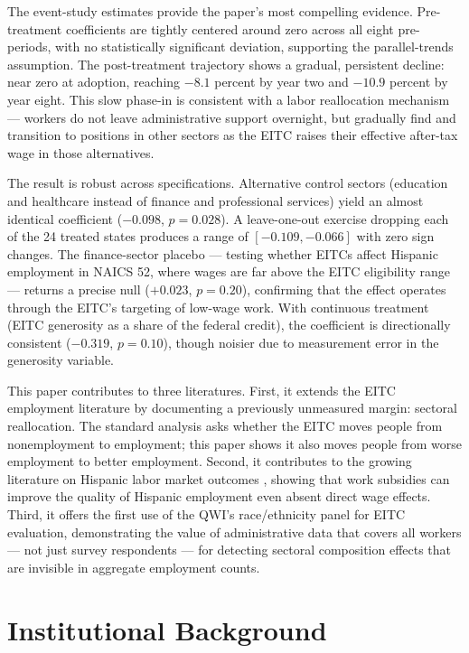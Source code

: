 \documentclass[12pt]{article}
\begin{document}
The event-study estimates provide the paper's most compelling evidence. Pre-treatment coefficients are tightly centered around zero across all eight pre-periods, with no statistically significant deviation, supporting the parallel-trends assumption. The post-treatment trajectory shows a gradual, persistent decline: near zero at adoption, reaching $-8.1$ percent by year two and $-10.9$ percent by year eight. This slow phase-in is consistent with a labor reallocation mechanism --- workers do not leave administrative support overnight, but gradually find and transition to positions in other sectors as the EITC raises their effective after-tax wage in those alternatives.

The result is robust across specifications. Alternative control sectors (education and healthcare instead of finance and professional services) yield an almost identical coefficient ($-0.098$, $p = 0.028$). A leave-one-out exercise dropping each of the 24 treated states produces a range of $[-0.109, -0.066]$ with zero sign changes. The finance-sector placebo --- testing whether EITCs affect Hispanic employment in NAICS 52, where wages are far above the EITC eligibility range --- returns a precise null ($+0.023$, $p = 0.20$), confirming that the effect operates through the EITC's targeting of low-wage work. With continuous treatment (EITC generosity as a share of the federal credit), the coefficient is directionally consistent ($-0.319$, $p = 0.10$), though noisier due to measurement error in the generosity variable.

This paper contributes to three literatures. First, it extends the EITC employment literature \citep{eissa1996labor, meyer2001taxes, chetty2013using, nichols2015earned} by documenting a previously unmeasured margin: sectoral reallocation. The standard analysis asks whether the EITC moves people from nonemployment to employment; this paper shows it also moves people from worse employment to better employment. Second, it contributes to the growing literature on Hispanic labor market outcomes \citep{borjas2017wage, peri2016immigrants, east2018effect}, showing that work subsidies can improve the quality of Hispanic employment even absent direct wage effects. Third, it offers the first use of the QWI's race/ethnicity panel for EITC evaluation, demonstrating the value of administrative data that covers all workers --- not just survey respondents --- for detecting sectoral composition effects that are invisible in aggregate employment counts.

\section{Institutional Background}
\end{document}
